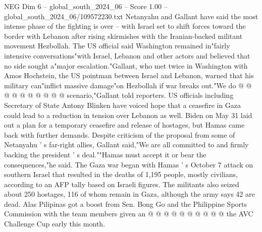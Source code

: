 \begin{textsample}{NEG Dim 6 – global\_south\_2024\_06 – Score 1.00 – global\_south\_2024\_06/109572230.txt}
Netanyahu and Gallant have said the most intense phase of the fighting is over -- with Israel set to shift forces toward the border with Lebanon after rising skirmishes with the Iranian-backed militant movement Hezbollah.
The US official said Washington remained in"fairly intensive conversations"with Israel, Lebanon and other actors and believed that no side sought a"major escalation."Gallant, who met twice in Washington with Amos Hochstein, the US pointman between Israel and Lebanon, warned that his military can"inflict massive damage"on Hezbollah if war breaks out."We do @ @ @ @ @ @ @ @ @ @ scenario,"Gallant told reporters.
US officials including Secretary of State Antony Blinken have voiced hope that a ceasefire in Gaza could lead to a reduction in tension over Lebanon as well.
Biden on May 31 laid out a plan for a temporary ceasefire and release of hostages, but Hamas came back with further demands.
Despite criticism of the proposal from some of Netanyahu ' s far-right allies, Gallant said,"We are all committed to and firmly backing the president ' s deal.""Hamas must accept it or bear the consequences,"he said.
The Gaza war began with Hamas ' s October 7 attack on southern Israel that resulted in the deaths of 1,195 people, mostly civilians, according to an AFP tally based on Israeli figures.
The militants also seized about 250 hostages, 116 of whom remain in Gaza, although the army says 42 are dead.
Alas Pilipinas got a boost from Sen.
Bong Go and the Philippine Sports Commission with the team members given an @ @ @ @ @ @ @ @ @ @ the AVC Challenge Cup early this month.

\end{textsample}
